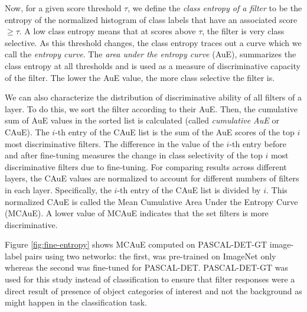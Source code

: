 Now, for a given score threshold $\tau$, we define the \emph{class entropy of a filter} to be the entropy of the normalized histogram of class labels that have an associated score $\geq \tau$.
A low class entropy means that at scores above $\tau$, the filter is very class selective.
As this threshold changes, the class entropy traces out a curve which we call the \emph{entropy curve}.
The \emph{area under the entropy curve} (AuE), summarizes the class entropy at all thresholds and is used as a measure of discriminative capacity of the filter. 
The lower the AuE value, the more class selective the filter is.

We can also characterize the distribution of discriminative ability of all filters of a layer.
To do this, we sort the filter according to their AuE.
Then, the cumulative sum of AuE values in the sorted list is calculated (called \emph{cumulative AuE} or CAuE). 
The $i$-th entry of the CAuE list is the sum of the AuE scores of the top $i$ most discriminative filters.
The difference in the value of the $i$-th entry before and after fine-tuning measures the change in class selectivity of the top $i$ most discriminative filters due to fine-tuning.
For comparing results across different layers, the CAuE values are normalized to account for different numbers of filters in each layer. 
Specifically, the $i$-th entry of the CAuE list is divided by $i$. 
This normalized CAuE is called the Mean Cumulative Area Under the Entropy Curve (MCAuE).
A lower value of MCAuE indicates that the set filters is more discriminative.

Figure \ref{fig:fine-entropy} shows MCAuE computed on PASCAL-DET-GT image-label pairs using two networks: the first, was pre-trained on ImageNet only whereas the second was fine-tuned for PASCAL-DET. 
PASCAL-DET-GT was used for this study instead of classification to ensure that filter responses were a direct result of presence of object categories of interest and not the background as might happen in the classification task.

